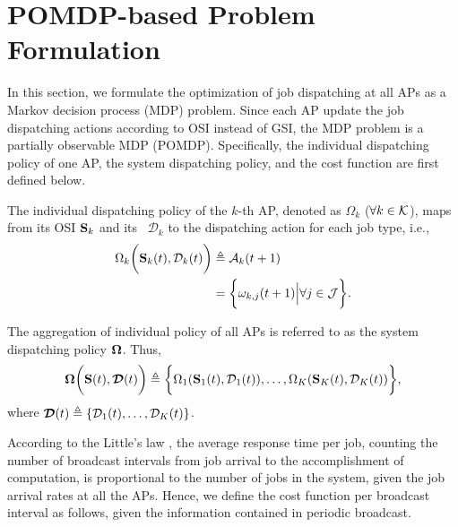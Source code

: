 \section{POMDP-based Problem Formulation}
\label{sec:formulation}
In this section, we formulate the optimization of job dispatching at all APs as a Markov decision process (MDP) problem.
Since each AP update the job dispatching actions according to OSI instead of GSI, the MDP problem is a partially observable MDP (POMDP).
Specifically, the individual dispatching policy of one AP, the system dispatching policy, and the cost function are first defined below.

\begin{definition}
    The individual dispatching policy of the $k$-th AP, denoted as $\Omega_{k}$ ($\forall k \in\mathcal{K}$), maps from its OSI $\mathbf{S}_{k}$ and its \brlatency~$\mathcal{D}_{k}$ to the dispatching action for each job type, i.e.,
    \begin{align}
        \Omega_{k} \bigg( \mathbf{S}_{k}(t), \mathcal{D}_{k}(t) \bigg)
        &\triangleq \mathcal{A}_{k}(t+1)
        \nonumber\\
        &= \bigg\{
            \omega_{k,j}(t+1) \Big| \forall j\in\mathcal{J}
        \bigg\}.
        \label{def:action}
    \end{align}

    The aggregation of individual policy of all APs is referred to as the system dispatching policy $\boldsymbol{\Omega}$.
    Thus,
    {\small
    \begin{align}
        \boldsymbol{\Omega}\bigg( \mathbf{S}(t), \boldsymbol{\mathcal{D}}(t) \bigg) \triangleq \bigg\{
            \Omega_{1}(\mathbf{S}_{1}(t), \mathcal{D}_{1}(t)), \dots, \Omega_{K}(\mathbf{S}_{K}(t),\mathcal{D}_{K}(t))
        \bigg\},
    \end{align}
    }
    where $\boldsymbol{\mathcal{D}}(t) \triangleq \{ \mathcal{D}_{1}(t), \dots, \mathcal{D}_{K}(t) \}$.
\end{definition}

According to the Little's law \cite{Little1961}, the average response time per job, counting the number of broadcast intervals from job arrival to the accomplishment of computation, is proportional to the number of jobs in the system, given the job arrival rates at all the APs.
Hence, we define the cost function per broadcast interval as follows, {given the information contained in periodic broadcast.}

